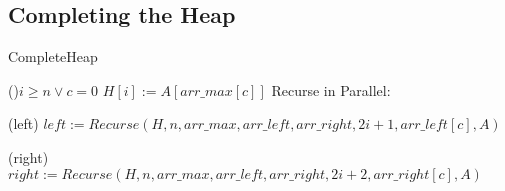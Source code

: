 \documentclass[letterpaper, reqno, 11pt]{article}
\begin{document}
\subsection*{Completing the Heap}
\begin{algorithm}[H]
\caption{CompleteHeap}
\If(){$i\geq n\lor c=0$}
{
	\Return\;
}
$H[i]:=A[arr\_max[c]]$
Recurse in Parallel:
\begin{description}
	\item{(left)} $left:=Recurse(H, n, arr\_max, arr\_left, arr\_right,
			2i+1, arr\_left[c], A)$\;
	\item{(right)} $right:=Recurse(H, n, arr\_max, arr\_left, arr\_right,
			2i+2, arr\_right[c], A)$\;
\end{description}
\end{algorithm}
\end{document}
